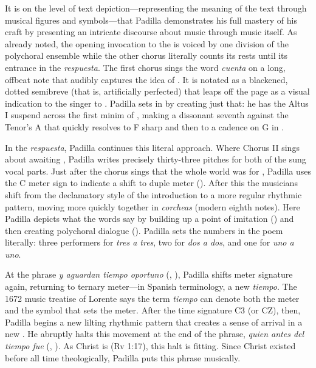It is on the level of text depiction---representing the meaning of the text
through musical figures and symbols---that Padilla demonstrates his full mastery
of his craft by presenting an intricate discourse about music through music
itself.
As already noted, the opening invocation to the  is voiced by one division of the polychoral
ensemble while the other chorus literally counts its rests until its entrance in
the \emph{respuesta}.
The first chorus sings the word \emph{cuenta} on a long, offbeat note that
audibly captures the idea of .
It is notated as a blackened, dotted semibreve (that is, artificially perfected)
that leaps off the page as a visual indication to the singer to .
Padilla sets  in  by creating
just that: he has the Altus I suspend across the first minim of ,
making a dissonant seventh against the Tenor's A that quickly resolves to F
sharp and then to a cadence on G in .

In the \emph{respuesta}, Padilla continues this literal approach.
Where Chorus II sings about awaiting , Padilla writes
precisely thirty-three pitches for both of the sung vocal parts.
Just after the chorus sings that the whole world was  for
, Padilla uses the C meter sign to indicate a shift to duple
meter ().
After this the musicians shift from the declamatory style of the introduction to
a more regular rhythmic pattern, moving more quickly together in \emph{corcheas}
(modern eighth notes).
Here Padilla depicts what the words say by building up a point of imitation
 () and then creating
polychoral dialogue ().
Padilla sets the numbers in the poem literally: three performers for \emph{tres
a tres}, two for \emph{dos a dos}, and one for \emph{uno a uno}.

At the phrase \emph{y aguardan tiempo oportuno} (, ), Padilla shifts meter signature again, returning
to ternary meter---in Spanish terminology, a new \emph{tiempo}.
The 1672 music treatise of Lorente says the term \emph{tiempo} can denote both
the meter and the symbol that sets the meter.%
    \Autocite[bk.~2, 149]{Lorente:Porque}
After the time signature C3 (or CZ), then, Padilla begins a new lilting rhythmic
pattern that creates a sense of arrival in a new .
He abruptly halts this movement at the end of the phrase, \emph{quien antes del
tiempo fue} (, ).
As Christ is  (Rv 1:17), this halt is fitting.
Since Christ existed before all time theologically, Padilla puts this phrase
 musically.

